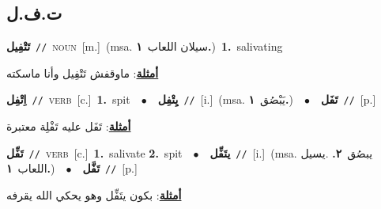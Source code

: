 \documentclass[10pt,a4paper,twoside]{article} %
\begin{document}
\begin{multicols}{2}
{{{{{{{{{{{\vspace{-3mm}
\subsection*{\color{blue}\foreignlanguage{arabic}{ت.ف.ل}\color{blue}{}} 

{\setlength\topsep{0pt}\textbf{\foreignlanguage{arabic}{تَتْفِيل}}\ {\color{gray}\texttt{//}\color{black}}\ \textsc{noun}\ [m.]\ \color{gray}(msa. \foreignlanguage{arabic}{سيلان اللعاب}~\foreignlanguage{arabic}{\textbf{١.}})\color{black}\ \textbf{1.}~salivating\  \begin{flushright}\color{gray}\foreignlanguage{arabic}{\textbf{\underline{\foreignlanguage{arabic}{أمثلة}}}: ماوقفش تَتْفِيل وأنا ماسكته}\end{flushright}\color{black}} \vspace{2mm}

{\setlength\topsep{0pt}\textbf{\foreignlanguage{arabic}{اِتْفِل}}\ {\color{gray}\texttt{//}\color{black}}\ \textsc{verb}\ [c.]\ \textbf{1.}~spit\ \ $\bullet$\ \ \setlength\topsep{0pt}\textbf{\foreignlanguage{arabic}{يِتْفِل}}\ {\color{gray}\texttt{//}\color{black}}\ [i.]\ \color{gray}(msa. \foreignlanguage{arabic}{يَبْصُق}~\foreignlanguage{arabic}{\textbf{١.}})\color{black}\ \ $\bullet$\ \ \setlength\topsep{0pt}\textbf{\foreignlanguage{arabic}{تَفَل}}\ {\color{gray}\texttt{//}\color{black}}\ [p.]\  \begin{flushright}\color{gray}\foreignlanguage{arabic}{\textbf{\underline{\foreignlanguage{arabic}{أمثلة}}}: تَفَل عليه تَفْلِة معتبرة}\end{flushright}\color{black}} \vspace{2mm}

{\setlength\topsep{0pt}\textbf{\foreignlanguage{arabic}{تَفِّل}}\ {\color{gray}\texttt{//}\color{black}}\ \textsc{verb}\ [c.]\ \textbf{1.}~salivate  \textbf{2.}~spit\ \ $\bullet$\ \ \setlength\topsep{0pt}\textbf{\foreignlanguage{arabic}{يتَفِّل}}\ {\color{gray}\texttt{//}\color{black}}\ [i.]\ \color{gray}(msa. \foreignlanguage{arabic}{يبصُق}~\foreignlanguage{arabic}{\textbf{٢.}}  .\foreignlanguage{arabic}{يسيل اللعاب}~\foreignlanguage{arabic}{\textbf{١.}})\color{black}\ \ $\bullet$\ \ \setlength\topsep{0pt}\textbf{\foreignlanguage{arabic}{تَفَّل}}\ {\color{gray}\texttt{//}\color{black}}\ [p.]\  \begin{flushright}\color{gray}\foreignlanguage{arabic}{\textbf{\underline{\foreignlanguage{arabic}{أمثلة}}}: بكون يتَفِّل وهو يحكي الله يقرفه}\end{flushright}\color{black}} \vspace{2mm}

}}}}}}}}}}}
\end{multicols}
\end{document}
